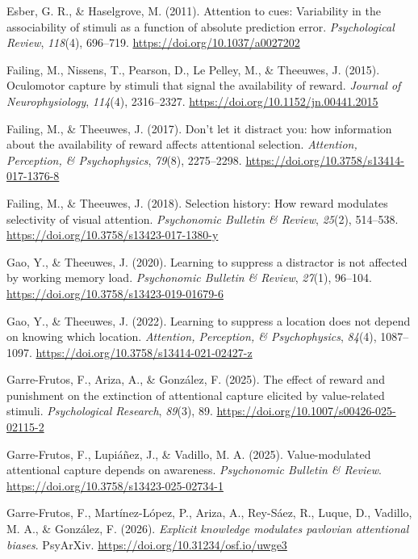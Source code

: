 \documentclass[
  man,
  floatsintext,
  longtable,
  nolmodern,
  notxfonts,
  notimes,
  mask,
  colorlinks=true,linkcolor=blue,citecolor=blue,urlcolor=blue]{apa7}
\newlength{\cslhangindent}
\newenvironment{CSLReferences}[2] %
 {\begin{list}{}{%
  \setlength{\itemindent}{0pt}
  \setlength{\leftmargin}{0pt}
  \setlength{\parsep}{0pt}
  \ifodd #1
   \setlength{\leftmargin}{\cslhangindent}
   \setlength{\itemindent}{-1\cslhangindent}
  \fi
  \setlength{\itemsep}{#2\baselineskip}}}
 {\end{list}}
\begin{document}
\begin{CSLReferences}{1}{0}
Esber, G. R., \& Haselgrove, M. (2011). Attention to cues: Variability
in the associability of stimuli as a function of absolute prediction
error. \emph{Psychological Review}, \emph{118}(4), 696--719.
\url{https://doi.org/10.1037/a0027202}

Failing, M., Nissens, T., Pearson, D., Le Pelley, M., \& Theeuwes, J.
(2015). Oculomotor capture by stimuli that signal the availability of
reward. \emph{Journal of Neurophysiology}, \emph{114}(4), 2316--2327.
\url{https://doi.org/10.1152/jn.00441.2015}

Failing, M., \& Theeuwes, J. (2017). Don{'}t let it distract you: how
information about the availability of reward affects attentional
selection. \emph{Attention, Perception, \& Psychophysics}, \emph{79}(8),
2275--2298. \url{https://doi.org/10.3758/s13414-017-1376-8}

Failing, M., \& Theeuwes, J. (2018). Selection history: How reward
modulates selectivity of visual attention. \emph{Psychonomic Bulletin \&
Review}, \emph{25}(2), 514--538.
\url{https://doi.org/10.3758/s13423-017-1380-y}

Gao, Y., \& Theeuwes, J. (2020). Learning to suppress a distractor is
not affected by working memory load. \emph{Psychonomic Bulletin \&
Review}, \emph{27}(1), 96--104.
\url{https://doi.org/10.3758/s13423-019-01679-6}

Gao, Y., \& Theeuwes, J. (2022). Learning to suppress a location does
not depend on knowing which location. \emph{Attention, Perception, \&
Psychophysics}, \emph{84}(4), 1087--1097.
\url{https://doi.org/10.3758/s13414-021-02427-z}

Garre-Frutos, F., Ariza, A., \& González, F. (2025). The effect of
reward and punishment on the extinction of attentional capture elicited
by value-related stimuli. \emph{Psychological Research}, \emph{89}(3),
89. \url{https://doi.org/10.1007/s00426-025-02115-2}

Garre-Frutos, F., Lupiáñez, J., \& Vadillo, M. A. (2025).
Value-modulated attentional capture depends on awareness.
\emph{Psychonomic Bulletin \& Review}.
\url{https://doi.org/10.3758/s13423-025-02734-1}

Garre-Frutos, F., Martínez-López, P., Ariza, A., Rey-Sáez, R., Luque,
D., Vadillo, M. A., \& González, F. (2026). \emph{Explicit knowledge
modulates pavlovian attentional biases}. PsyArXiv.
\url{https://doi.org/10.31234/osf.io/uwge3}


\end{CSLReferences}
\end{document}
